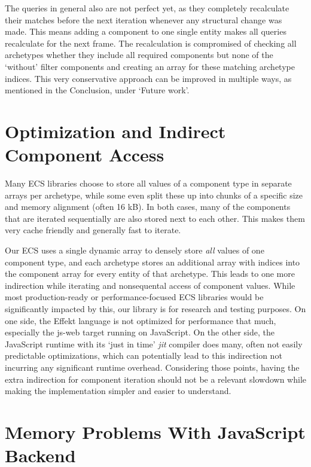 The queries in general also are not perfect yet, as they completely recalculate their matches before the next iteration whenever any structural change was made. This means adding a component to one single entity makes all queries recalculate for the next frame. The recalculation is compromised of checking all archetypes whether they include all required components but none of the `without' filter components and creating an array for these matching archetype indices. This very conservative approach can be improved in multiple ways, as mentioned in the Conclusion, under `Future work'.

\section{Optimization and Indirect Component Access}\label{sec:indirectaccess}

Many ECS libraries choose to store all values of a component type in separate arrays per archetype, while some even split these up into chunks of a specific size and memory alignment (often 16 kB). In both cases, many of the components that are iterated sequentially are also stored next to each other. This makes them very cache friendly and generally fast to iterate.

Our ECS uses a single dynamic array to densely store \textit{all} values of one component type, and each archetype stores an additional array with indices into the component array for every entity of that archetype. This leads to one more indirection while iterating and nonsequental access of component values. While most production-ready or performance-focused ECS libraries would be significantly impacted by this, our library is for research and testing purposes. On one side, the Effekt language is not optimized for performance that much, especially the \textsf{js-web} target running on JavaScript. On the other side, the JavaScript runtime with its `just in time' \textit{jit} compiler does many, often not easily predictable optimizations, which can potentially lead to this indirection not incurring any significant runtime overhead. Considering those points, having the extra indirection for component iteration should not be a relevant slowdown while making the implementation simpler and easier to understand.

\section{Memory Problems With JavaScript Backend}\label{sec:memoryproblem}

